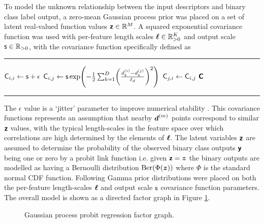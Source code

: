 To model the unknown relationship between the input descriptors and binary class label output, a zero-mean Gaussian process prior \citep{rasmussen2006gaussian} was placed on a set of latent real-valued function values $\boldsymbol{\mathsf{z}} \in \mathbb{R}^M$. A squared exponential covariance function was used with per-feature length scales $\boldsymbol{\mathsf{\ell}} \in \mathbb{R}_{>0}^K$ and output scale $\mathsf{s} \in \mathbb{R}_{>0}$, with the covariance function specifically defined as
{
\vspace{2mm}
\hrule
\small
\vspace{1mm}
\begin{algorithmic}
      \State $\mathsf{C}_{i,i} \gets \mathsf{s} + \epsilon$
        \State $\rvar{C}_{i,j} \gets \rvar{s} \exp\lpa -\frac{1}{2} \sum_{k=1}^D \lpa \frac{d_k^{(i)} - d_k^{(j)}}{\rvar{\ell}_d} \rpa^2 \rpa$
        \State $\mathsf{C}_{j,i} \gets \mathsf{C}_{i,j}$
      \EndFor
    \EndFor
    \State\Return $\boldsymbol{\mathsf{C}}$
  \EndFunction
\end{algorithmic}
\vspace{2mm}
\hrule
\vspace{1mm}
}
The $\epsilon$ value is a `jitter' parameter to improve numerical stability \citep{rasmussen2006gaussian}. This covariance functions represents an assumption that nearby $\boldsymbol{d}^{(m)}$ points correspond to similar $\boldsymbol{\mathsf{z}}$ values, with the typical length-scales in the feature space over which correlations are high determined by the elements of $\boldsymbol{\mathsf{\ell}}$. The latent variables $\boldsymbol{\mathsf{z}}$ are assumed to determine the probability of the observed binary class outputs $\boldsymbol{\mathsf{y}}$ being one or zero by a probit link function i.e. given $\boldsymbol{\mathsf{z}}=\boldsymbol{z}$ the binary outputs are modelled as having a Bernoulli distribution $\textrm{Ber}(\Phi(\boldsymbol{z}))$ where $\Phi$ is the standard normal \ac{CDF} function. Following \citep{filippone2014pseudo} Gamma prior distributions were placed on both the per-feature length-scales $\boldsymbol{\mathsf{\ell}}$ and output scale $\mathsf{s}$ covariance function parameters. The overall model is shown as a directed factor graph in Figure \ref{fig:gaussian-process-probit-regression-factor-graph}.

\begin{figure}[!t]
\centering
{}
\caption{Gaussian process probit regression factor graph.}
\label{fig:gaussian-process-probit-regression-factor-graph}
\end{figure}

